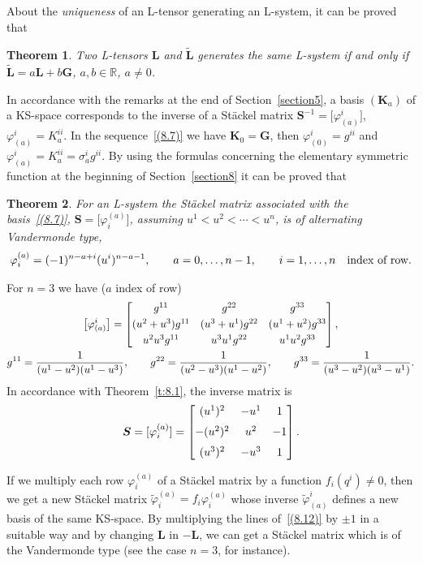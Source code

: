 \documentclass[10pt,a4paper]{amsart}
\def\bs{\boldsymbol}
\numberwithin{equation}{section}
\newtheorem{Theorem}{Theorem}[section]
 { \theoremstyle{definition}
\newtheorem{Notation}[Theorem]{Notation}
\newtheorem{Example}[Theorem]{Example}
\newtheorem{Remark}[Theorem]{Remark}
\newtheorem{Remarks}[Theorem]{Remarks}
 }
\begin{document}
About the {\it uniqueness} of an L-tensor generating an L-system, it can be proved that

\begin{Theorem}
Two L-tensors $\bs L$ and $\tilde{\bs L}$ generates the same L-system if and only if $\tilde{\bs L}=a\bs L+b\bs G$, $a,b\in\mathbb R$, $a\neq 0$.
\end{Theorem}

In accordance with the remarks at the end of Section~\ref{section5}, a basis
$(\bs K_a)$ of a KS-space corresponds to the inverse of a St\"ackel matrix
$\bs S^{-1}=\big[\varphi_{(a)}^i\big]$, $\varphi_{(a)}^i=K_a^{ii}$.
In the sequence~\eqref{(8.7)} we have \mbox{$\bs K_0=\bs G$}, then $\varphi_{(0)}^i=g^{ii}$ and $\varphi_{(a)}^i=K_a^{ii}=\sigma_a^ig^{ii}$.
By using the formulas concerning the elementary symmetric function at the beginning of Section~\ref{section8} it can be proved that

\begin{Theorem}
For an L-system the St\"ackel matrix associated with the basis~\eqref{(8.7)}, $\bs S=\big[\varphi_i^{(a)} \big]$, assuming $u^1<u^2<\cdots<u^n$, is of  alternating Vandermonde type,
\begin{gather}
\varphi_i^{(a)}=(-1)^{n-a+i}  (u^i)^{n-a-1}, \qquad
a=0,\ldots,n-1,\qquad
i=1,\ldots,n\quad \hbox{\rm index of row.}
\label{(8.12)}
\end{gather}
\end{Theorem}

For $n=3$ we have ($a$ index of row)
\begin{gather*}
\big[\varphi_{(a)}^i\big]=\bmatrix
g^{11} & g^{22} & g^{33}
\\[3pt]
(u^2+u^3)g^{11} & (u^3+u^1)g^{22} & (u^1+u^2)g^{33}
\\[3pt]
u^2u^3g^{11} & u^3u^1g^{22} & u^1u^2g^{33}
\endbmatrix,\\
g^{11}=\dfrac{1}{(u^1-u^2)(u^1-u^3)},
\qquad
g^{22}=\dfrac{1}{(u^2-u^3)(u^1-u^2)},
\qquad
g^{33}=\dfrac{1}{(u^3-u^2)(u^3-u^1)}.
\end{gather*}
In accordance with Theorem~\ref{t:8.1}, the inverse matrix is
\begin{gather*}
\bs S=[\varphi_i^{(a)}]=\bmatrix
(u^1)^2 & -u^1 & 1
\\[6pt]
- (u^2)^2 & u^2 & -1
\\[6pt]
(u^3)^2 & -u^3 & 1 \cr\endbmatrix.
\end{gather*}

\begin{Remark}  If we multiply each row $\varphi_i^{(a)}$ of a St\"ackel matrix by a function $f_i(q^i)\neq 0$, then we get a new St\"ackel matrix $\tilde\varphi_i^{(a)}=f_i\varphi_i^{(a)}$ whose inverse $\tilde\varphi^i_{(a)}$ def\/ines a new basis of the  same KS-space. By multiplying the lines of~\eqref{(8.12)} by $\pm 1$ in a suitable way and by changing $\bs L$ in $-\bs L$, we can get a St\"ackel matrix which is of the Vandermonde type (see the case $n=3$, for instance).
\end{Remark}
\end{document}
